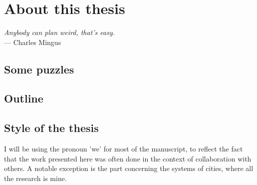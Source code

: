 

\chapter{About this thesis}
\label{chap:methodology}


\begin{flushright}{\slshape    
Anybody can plan weird, that's easy.} \\ \medskip
--- Charles Mingus
\end{flushright}

\bigskip


\section{Some puzzles}

\section{Outline}

\section{Style of the thesis}

I will be using the pronoun 'we' for most of the manuscript, to reflect the fact
that the work presented here was often done in the context of collaboration with others. A
notable exception is the part concerning the systems of cities, where all the
research is mine.
